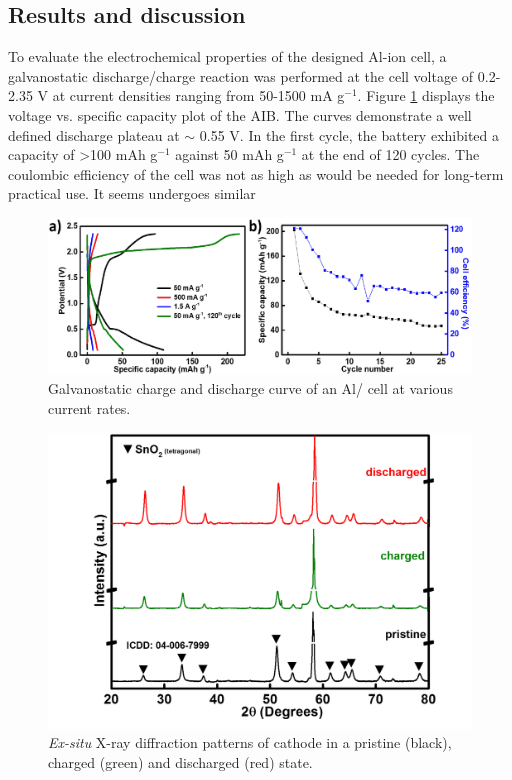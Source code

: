 \subsection{Results and discussion}
To evaluate the electrochemical properties of the designed Al-ion cell, a galvanostatic discharge/charge reaction was performed at the cell voltage of 0.2-2.35 V at current densities ranging from 50-1500 mA g$^{-1}$. Figure \ref{Figures/chap6fig:SnO2perfCDC} displays the voltage vs. specific capacity plot of the AIB. The curves demonstrate a well defined discharge plateau at $\sim$ 0.55 V. In the first cycle, the
battery exhibited a capacity of >100 mAh g$^{-1}$ against 50 mAh g$^{-1}$ at the end of 120 cycles. The coulombic efficiency of the cell was not as high as would be needed for long-term practical use. It seems  undergoes similar  

 \begin{figure}[th!]
  \centering
  \includegraphics[width=\textwidth]{Figures/chap6fig/SnO2perfCDC}
    \caption{Galvanostatic charge and discharge curve of an Al/ cell at various current rates.}
  \label{Figures/chap6fig:SnO2perfCDC}
\end{figure}

 \begin{figure}[th!]
  \centering
  \includegraphics[width=\textwidth]{Figures/chap6fig/SnO2XRD}
    \caption{\textit{Ex-situ} X-ray diffraction patterns of  cathode in a pristine (black), charged (green) and discharged (red) state.}
  \label{Figures/chap6fig:SnO2XRD}
\end{figure}


